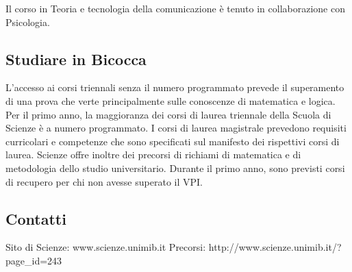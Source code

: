 Il corso in Teoria e tecnologia della comunicazione è tenuto in collaborazione con Psicologia. 

\subsection{Studiare in Bicocca}
L'accesso ai corsi triennali senza il numero programmato prevede il superamento di una prova che verte principalmente sulle conoscenze di matematica e logica. Per il primo anno, la maggioranza dei corsi di laurea triennale della Scuola di Scienze è a numero programmato. I corsi di laurea magistrale prevedono requisiti curricolari e competenze che sono specificati sul manifesto dei rispettivi corsi di laurea. 
Scienze offre inoltre dei precorsi di richiami di matematica e di metodologia dello studio universitario. Durante il primo anno, sono previsti corsi di recupero per chi non avesse superato il VPI. 

\subsection{Contatti}
Sito di Scienze: www.scienze.unimib.it 
Precorsi: http://www.scienze.unimib.it/?page\_id=243
